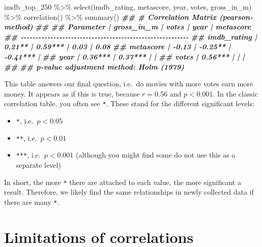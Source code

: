 \documentclass[
]{book}
\newenvironment{Shaded}{\begin{snugshade}}{\end{snugshade}}
\newcommand{\DocumentationTok}[1]{\textcolor[rgb]{0.56,0.35,0.01}{\textbf{\textit{#1}}}}
\newcommand{\FunctionTok}[1]{\textcolor[rgb]{0.00,0.00,0.00}{#1}}
\newcommand{\NormalTok}[1]{#1}
\newcommand{\SpecialCharTok}[1]{\textcolor[rgb]{0.00,0.00,0.00}{#1}}
\begin{document}
\begin{Shaded}
\begin{Highlighting}[]
\NormalTok{imdb\_top\_250 }\SpecialCharTok{\%\textgreater{}\%}
  \FunctionTok{select}\NormalTok{(imdb\_rating, metascore, year, votes, gross\_in\_m) }\SpecialCharTok{\%\textgreater{}\%}
  \FunctionTok{correlation}\NormalTok{() }\SpecialCharTok{\%\textgreater{}\%}
  \FunctionTok{summary}\NormalTok{()}
\DocumentationTok{\#\# \# Correlation Matrix (pearson{-}method)}
\DocumentationTok{\#\# }
\DocumentationTok{\#\# Parameter   | gross\_in\_m |   votes |     year | metascore}
\DocumentationTok{\#\# {-}{-}{-}{-}{-}{-}{-}{-}{-}{-}{-}{-}{-}{-}{-}{-}{-}{-}{-}{-}{-}{-}{-}{-}{-}{-}{-}{-}{-}{-}{-}{-}{-}{-}{-}{-}{-}{-}{-}{-}{-}{-}{-}{-}{-}{-}{-}{-}{-}{-}{-}{-}{-}{-}{-}{-}{-}}
\DocumentationTok{\#\# imdb\_rating |     0.21** | 0.59*** |     0.03 |      0.08}
\DocumentationTok{\#\# metascore   |      {-}0.13 | {-}0.25** | {-}0.41*** |          }
\DocumentationTok{\#\# year        |    0.36*** | 0.37*** |          |          }
\DocumentationTok{\#\# votes       |    0.56*** |         |          |          }
\DocumentationTok{\#\# }
\DocumentationTok{\#\# p{-}value adjustment method: Holm (1979)}
\end{Highlighting}
\end{Shaded}

This table answers our final question, i.e.~do movies with more votes earn more money. It appears as if this is true, because \(r = 0.56\) and \(p < 0.001\). In the classic correlation table, you often see \texttt{*}. These stand for the different significant levels:

\begin{itemize}
\item
  \texttt{*}, i.e.~\(p < 0.05\)
\item
  \texttt{**}, i.e.~\(p < 0.01\)
\item
  \texttt{***}, i.e.~\(p < 0.001\) (although you might find some do not use this as a separate level)
\end{itemize}

In short, the more \texttt{*} there are attached to each value, the more significant a result. Therefore, we likely find the same relationships in newly collected data if there are many \texttt{*}.

\hypertarget{limitations-of-correlations}{%
\section{Limitations of correlations}\label{limitations-of-correlations}}
\end{document}
